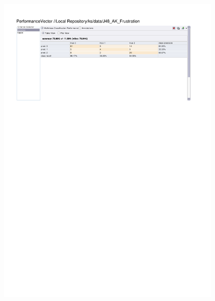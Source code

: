 \begin{figure}[htp]
  \centerline{\includegraphics[trim=0 680 0 60,clip,width=16.09cm]{results/J48_A_Frustration.pdf}} \caption{
} \label{J48_K_Frustration}
\end{figure}

